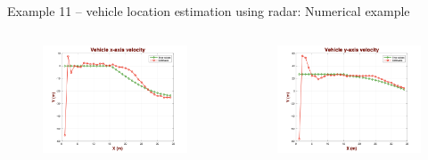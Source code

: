 \begin{frame}{Example 11 – vehicle location estimation using radar: Numerical example}
\begin{columns}
\begin{figure}
    \centering
    \includegraphics[width=0.9\linewidth]{Figures//Part3/ex11_x_Velocity.png}
\end{figure}
\vspace{-14pt}
\begin{figure}
    \centering
    \includegraphics[width=0.9\linewidth]{Figures//Part3/ex11_y_Velocity.png}
\end{figure}
\end{columns}
\end{frame}

